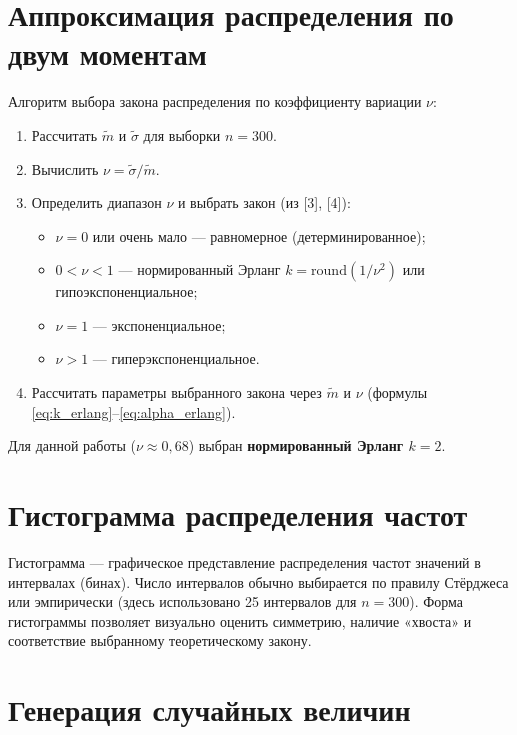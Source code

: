 \documentclass[a4paper,12pt]{article}
\begin{document}
\section{Аппроксимация распределения по двум моментам}

Алгоритм выбора закона распределения по коэффициенту вариации $\nu$:

\begin{enumerate}
    \item Рассчитать $\tilde{m}$ и $\tilde{\sigma}$ для выборки $n=300$.
    \item Вычислить $\nu = \tilde{\sigma}/\tilde{m}$.
    \item Определить диапазон $\nu$ и выбрать закон (из [3], [4]):
    \begin{itemize}
        \item $\nu = 0$ или очень мало — равномерное (детерминированное);
        \item $0 < \nu < 1$ — нормированный Эрланг $k = \text{round}(1/\nu^2)$ или гипоэкспоненциальное;
        \item $\nu = 1$ — экспоненциальное;
        \item $\nu > 1$ — гиперэкспоненциальное.
    \end{itemize}
    \item Рассчитать параметры выбранного закона через $\tilde{m}$ и $\nu$ (формулы \eqref{eq:k_erlang}–\eqref{eq:alpha_erlang}).
\end{enumerate}

Для данной работы ($\nu \approx 0{,}68$) выбран \textbf{нормированный Эрланг $k=2$}.

\section{Гистограмма распределения частот}
Гистограмма — графическое представление распределения частот значений в интервалах (бинах).
Число интервалов обычно выбирается по правилу Стёрджеса или эмпирически (здесь использовано 25 интервалов для $n=300$).
Форма гистограммы позволяет визуально оценить симметрию, наличие «хвоста» и соответствие выбранному теоретическому закону.

\section{Генерация случайных величин}
\end{document}
